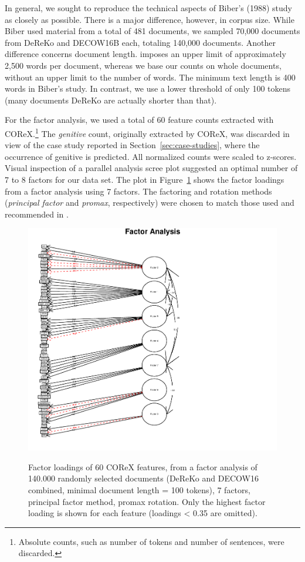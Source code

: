 In general, we sought to reproduce the technical aspects of Biber's (1988) study as closely as possible.
There is a major difference, however, in corpus size.
While Biber used material from a total of 481 documents, %
 we sampled 70,000 documents from DeReKo and DECOW16B each, totaling 140,000 documents.
Another difference concerns document length.
\cite{Biber1988} imposes an upper limit of approximately 2,500 words per document, whereas we base our counts on whole documents, without an upper limit to the number of words.
The minimum text length is 400 words in Biber's study.
In contrast, we use a lower threshold of only 100 tokens (many documents DeReKo are actually shorter than that).

For the factor analysis, we used a total of 60 feature counts extracted with COReX.\footnote{Absolute counts, such as number of tokens and number of sentences, were discarded.}
The \textit{genitive} count, originally extracted by COReX, was discarded in view of the case study reported in Section~\ref{sec:case-studies}, where the occurrence of genitive is predicted.
 All normalized counts were scaled to z-scores.
 Visual inspection of a parallel analysis scree plot suggested an optimal number of 7 to 8 factors for our data set.
 The plot in Figure~\ref{fa-pa-7-factors} shows the factor loadings from a factor analysis using 7 factors.
 The factoring and rotation methods (\textit{principal factor} and \textit{promax}, respectively) were chosen to match those used and recommended in \cite{Biber1988}.
 
 
\begin{figure}
   \includegraphics[scale=.9]{../R/fa-fa-7-promax-padded}
   \label{fa-pa-7-factors}
  \caption{Factor loadings of 60 COReX features, from a factor analysis of 140.000 randomly selected documents (DeReKo and DECOW16 combined, minimal document length = 100 tokens), 7 factors, principal factor method, promax rotation. Only the highest factor loading is shown for each feature (loadings < 0.35 are omitted).}  
\end{figure}




